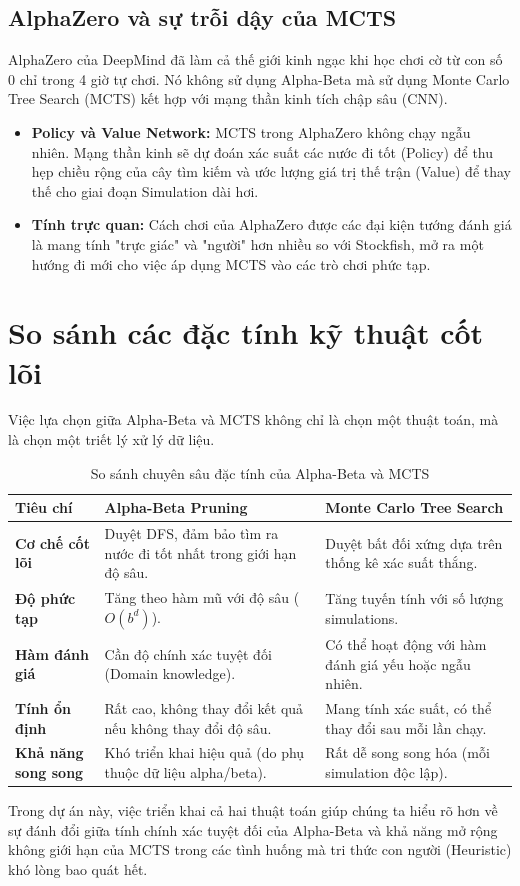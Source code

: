 \subsection{AlphaZero và sự trỗi dậy của MCTS}
AlphaZero của DeepMind đã làm cả thế giới kinh ngạc khi học chơi cờ từ con số 0 chỉ trong 4 giờ tự chơi. Nó không sử dụng Alpha-Beta mà sử dụng Monte Carlo Tree Search (MCTS) kết hợp với mạng thần kinh tích chập sâu (CNN).
\begin{itemize}
    \item \textbf{Policy và Value Network:} MCTS trong AlphaZero không chạy ngẫu nhiên. Mạng thần kinh sẽ dự đoán xác suất các nước đi tốt (Policy) để thu hẹp chiều rộng của cây tìm kiếm và ước lượng giá trị thế trận (Value) để thay thế cho giai đoạn Simulation dài hơi.
    \item \textbf{Tính trực quan:} Cách chơi của AlphaZero được các đại kiện tướng đánh giá là mang tính "trực giác" và "người" hơn nhiều so với Stockfish, mở ra một hướng đi mới cho việc áp dụng MCTS vào các trò chơi phức tạp.
\end{itemize}

\section{So sánh các đặc tính kỹ thuật cốt lõi}

Việc lựa chọn giữa Alpha-Beta và MCTS không chỉ là chọn một thuật toán, mà là chọn một triết lý xử lý dữ liệu.

\begin{table}[H]
    \centering
    \caption{So sánh chuyên sâu đặc tính của Alpha-Beta và MCTS}
    \label{tab:deep_comparison}
    \begin{tabularx}{\textwidth}{|l|X|X|}
        \hline
        \textbf{Tiêu chí} & \textbf{Alpha-Beta Pruning} & \textbf{Monte Carlo Tree Search} \\ \hline
        \textbf{Cơ chế cốt lõi} & Duyệt DFS, đảm bảo tìm ra nước đi tốt nhất trong giới hạn độ sâu. & Duyệt bất đối xứng dựa trên thống kê xác suất thắng. \\ \hline
        \textbf{Độ phức tạp} & Tăng theo hàm mũ với độ sâu ($O(b^d)$). & Tăng tuyến tính với số lượng simulations. \\ \hline
        \textbf{Hàm đánh giá} & Cần độ chính xác tuyệt đối (Domain knowledge). & Có thể hoạt động với hàm đánh giá yếu hoặc ngẫu nhiên. \\ \hline
        \textbf{Tính ổn định} & Rất cao, không thay đổi kết quả nếu không thay đổi độ sâu. & Mang tính xác suất, có thể thay đổi sau mỗi lần chạy. \\ \hline
        \textbf{Khả năng song song} & Khó triển khai hiệu quả (do phụ thuộc dữ liệu alpha/beta). & Rất dễ song song hóa (mỗi simulation độc lập). \\ \hline
    \end{tabularx}
\end{table}

Trong dự án này, việc triển khai cả hai thuật toán giúp chúng ta hiểu rõ hơn về sự đánh đổi giữa tính chính xác tuyệt đối của Alpha-Beta và khả năng mở rộng không giới hạn của MCTS trong các tình huống mà tri thức con người (Heuristic) khó lòng bao quát hết.
